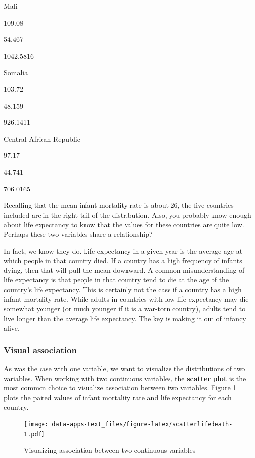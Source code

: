 \documentclass[
]{book}
\begin{document}
Mali

109.08

54.467

1042.5816

Somalia

103.72

48.159

926.1411

Central African Republic

97.17

44.741

706.0165

Recalling that the mean infant mortality rate is about 26, the five countries included are in the right tail of the distribution. Also, you probably know enough about life expectancy to know that the values for these countries are quite low. Perhaps these two variables share a relationship?

In fact, we know they do. Life expectancy in a given year is the average age at which people in that country died. If a country has a high frequency of infants dying, then that will pull the mean downward. A common misunderstanding of life expectancy is that people in that country tend to die at the age of the country's life expectancy. This is certainly not the case if a country has a high infant mortality rate. While adults in countries with low life expectancy may die somewhat younger (or much younger if it is a war-torn country), adults tend to live longer than the average life expectancy. The key is making it out of infancy alive.

\hypertarget{visual-association}{%
\subsubsection*{Visual association}\label{visual-association}}

As was the case with one variable, we want to visualize the distributions of two variables. When working with two continuous variables, the \textbf{scatter plot} is the most common choice to visualize association between two variables. Figure \ref{fig:scatterlifedeath} plots the paired values of infant mortality rate and life expectancy for each country.

\begin{figure}
\centering
\texttt{[image: data-apps-text\_files/figure-latex/scatterlifedeath-1.pdf]}
\caption{\label{fig:scatterlifedeath}Visualizing association between two continuous variables}
\end{figure}
\end{document}
